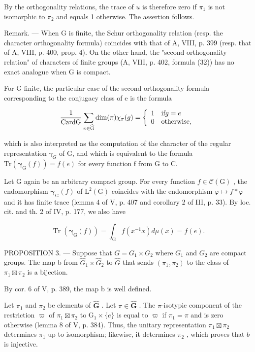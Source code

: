 By the orthogonality relations, the trace of \(u\) is therefore zero if \(\pi_1\) is not isomorphic to \(\pi_2\) and equals 1 otherwise. The assertion follows.

Remark. --- When G is finite, the Schur orthogonality relation (resp. the character orthogonality formula) coincides with that of A, VIII, p. 399 (resp. that of A, VIII, p. 400, prop. 4). On the other hand, the "second orthogonality relation" of characters of finite groups (A, VIII, p. 402, formula (32)) has no exact analogue when G is compact.

For G finite, the particular case of the second orthogonality formula corresponding to the conjugacy class of e is the formula

\[
\frac {1}{\mathrm{CardG}} \sum_ {\pi \in \widehat {\mathrm{G}}} \dim (\pi) \chi _ {\pi} (g) = \left\{ \begin{array}{l l} 1 & \text {if} g = e \\ 0 & \text {otherwise}, \end{array} \right.
\]

which is also interpreted as the computation of the character of the regular representation \(\gamma_{G}\) of G, and which is equivalent to the formula \(\mathrm{Tr}(\boldsymbol{\gamma}_{\mathrm{G}}(f)) = f(e)\) for every function f from G to C.

Let G again be an arbitrary compact group. For every function \(f \in \mathcal{C}(\mathrm{G})\) , the endomorphism \(\boldsymbol{\gamma}_{\mathrm{G}}(f)\) of \(\mathrm{L}^{2}(\mathrm{G})\) coincides with the endomorphism \(\varphi \mapsto f * \varphi\) and it has finite trace (lemma 4 of V, p. 407 and corollary 2 of III, p. 33). By loc. cit. and th. 2 of IV, p. 177, we also have

\[
\operatorname{Tr} \left(\boldsymbol {\gamma} _ {\mathrm{G}} (f)\right) = \int_ {\mathrm{G}} f \left(x ^ {- 1} x\right) d \mu (x) = f (e).
\]

PROPOSITION 3. --- Suppose that \(G = G_{1} \times G_{2}\) where \(G_{1}\) and \(G_{2}\) are compact groups. The map b from \(\widehat{G}_{1} \times \widehat{G}_{2}\) to \(\widehat{G}\) that sends \((\pi_{1}, \pi_{2})\) to the class of \(\pi_{1} \boxtimes \pi_{2}\) is a bijection.

By cor. 6 of V, p. 389, the map b is well defined.

Let \(\pi_1\) and \(\pi_2\) be elements of \(\widehat{\mathbf{G}}\) . Let \(\pi \in \widehat{\mathbf{G}}\) . The \(\pi\)-isotypic component of the restriction \(\varpi\) of \(\pi_1 \boxtimes \pi_2\) to \(\mathrm{G}_1 \times \{e\}\) is equal to \(\varpi\) if \(\pi_1 = \pi\) and is zero otherwise (lemma 8 of V, p. 384). Thus, the unitary representation \(\pi_1 \boxtimes \pi_2\) determines \(\pi_1\) up to isomorphism; likewise, it determines \(\pi_2\) , which proves that \(b\) is injective.

